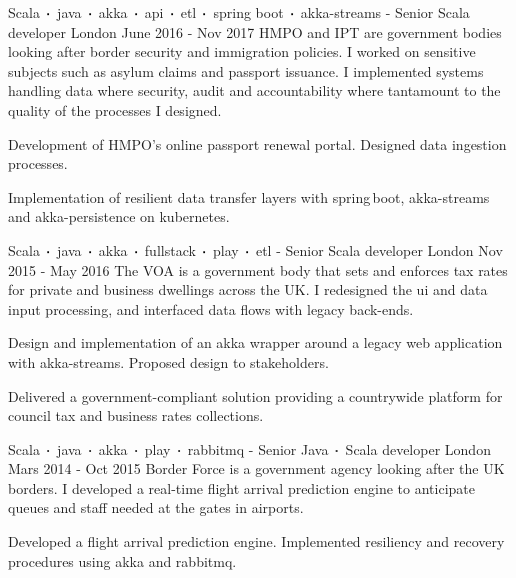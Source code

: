 \begin{cventries}
    \cventry
    {Scala$\sqbig$java$\sqbig$akka$\sqbig$api$\sqbig$etl$\sqbig$spring boot$\sqbig$akka-streams}
    { - Senior Scala developer}
    {London}
    {June 2016 - Nov 2017}
    {HMPO and IPT are government bodies looking after border security and immigration policies. I worked on sensitive subjects such as asylum claims and passport issuance. I implemented systems handling data where security, audit and accountability where tantamount to the quality of the processes I designed.}
    {
        \begin{cvitems}
            \item{Development of HMPO's online passport renewal portal. Designed data ingestion processes.}
            \item{Implementation of resilient data transfer layers with spring\,boot, akka-streams and akka-persistence on kubernetes.}
        \end{cvitems}
    }

    \cventry
    {Scala$\sqbig$java$\sqbig$akka$\sqbig$fullstack$\sqbig$play$\sqbig$etl}
    { - Senior Scala developer}
    {London}
    {Nov 2015 - May 2016}
    {The VOA is a government body that sets and enforces tax rates for private and business dwellings across the UK. I redesigned the ui and data input processing, and interfaced data flows with legacy back-ends. }
    {
        \begin{cvitems}
            \item{Design and implementation of an akka wrapper around a legacy web application with akka-streams. Proposed design to stakeholders.}
            \item{Delivered a government-compliant solution providing a countrywide platform for council tax and business rates collections.}
        \end{cvitems}
    }

    \cventry
    {Scala$\sqbig$java$\sqbig$akka$\sqbig$play$\sqbig$rabbitmq}
    { - Senior Java$\sqbig$Scala developer}
    {London}
    {Mars 2014 - Oct 2015}
    {Border Force is a government agency looking after the UK borders. I developed a real-time flight arrival prediction engine to anticipate queues and staff needed at the gates in airports.}
    {
        \begin{cvitems}
            \item{Developed a flight arrival prediction engine. Implemented resiliency and recovery procedures using akka and rabbitmq.}
        \end{cvitems}
    }


\end{cventries}

